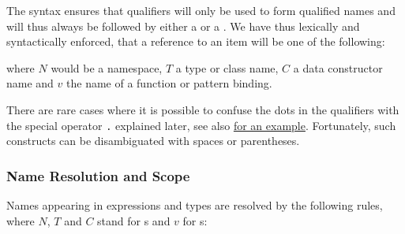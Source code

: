 The syntax ensures that qualifiers will
only be used to form qualified names and will
thus always be followed by either a
 or a . We have thus lexically and syntactically
enforced, that a reference to an item will be one of
the following:


where $N$ would be a namespace, $T$ a type or class name, $C$ a
data constructor name and $v$ the name of a function or pattern binding.

There are rare cases where it is possible to confuse the dots in the qualifiers with
the special operator \texttt{.} explained later, see also \hyperref[confusedots]{for an example}. 
Fortunately, such constructs can be disambiguated with spaces or parentheses.


\subsubsection{Name Resolution and Scope}

Names appearing in expressions and types are resolved by the following rules, where $N$, $T$ and $C$ stand for s and $v$ for s:

